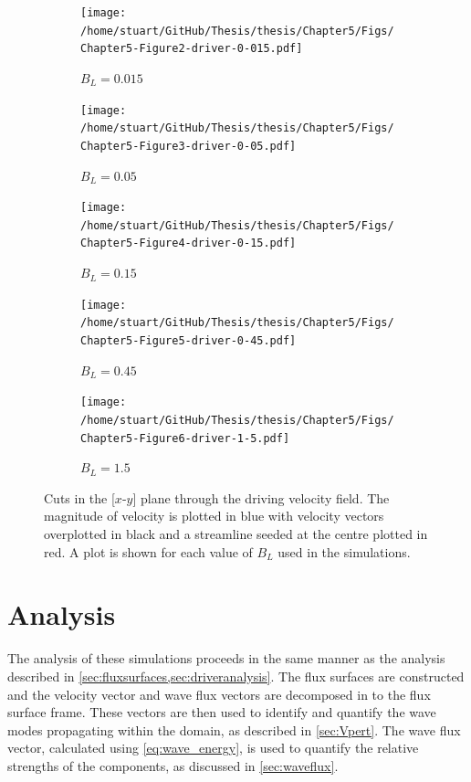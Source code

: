 \documentclass[a4paper,12pt,fourier,authoryear,custommargin]{Classes/PhDThesisPSnPDF}
\begin{document}
\begin{figure}
    \centering
    

    \begin{subfigure}[b]{0.495\columnwidth}
        \texttt{[image: /home/stuart/GitHub/Thesis/thesis/Chapter5/Figs/Chapter5-Figure2-driver-0-015.pdf]}
        \caption{$B_L = 0.015$}
        \label{fig:driver-0-015}
    \end{subfigure}
    \begin{subfigure}[b]{0.495\columnwidth}
        \texttt{[image: /home/stuart/GitHub/Thesis/thesis/Chapter5/Figs/Chapter5-Figure3-driver-0-05.pdf]}
        \caption{$B_L = 0.05$}
        \label{fig:driver-0-05}
    \end{subfigure}

    \begin{subfigure}[b]{0.495\columnwidth}
        \texttt{[image: /home/stuart/GitHub/Thesis/thesis/Chapter5/Figs/Chapter5-Figure4-driver-0-15.pdf]}
        \caption{$B_L = 0.15$}
        \label{fig:driver-0-15}
    \end{subfigure}
    \begin{subfigure}[b]{0.495\columnwidth}
        \texttt{[image: /home/stuart/GitHub/Thesis/thesis/Chapter5/Figs/Chapter5-Figure5-driver-0-45.pdf]}
        \caption{$B_L = 0.45$}
        \label{fig:driver-0-45}
    \end{subfigure}

    \begin{subfigure}[b]{0.495\columnwidth}
        \texttt{[image: /home/stuart/GitHub/Thesis/thesis/Chapter5/Figs/Chapter5-Figure6-driver-1-5.pdf]}
        \caption{$B_L = 1.5$}
        \label{fig:driver-1-5}
    \end{subfigure}
    \caption{Cuts in the [$x$-$y$] plane through the driving velocity field. The magnitude of velocity is plotted in blue with velocity vectors overplotted in black and a streamline seeded at the centre plotted in red. A plot is shown for each value of $B_L$ used in the simulations.}
    \label{fig:All_log_spirals}
\end{figure}

\section{Analysis}\label{sec:analysis}

The analysis of these simulations proceeds in the same manner as the analysis described in \cref{sec:fluxsurfaces,sec:driveranalysis}.
The flux surfaces are constructed and the velocity vector and wave flux vectors are decomposed in to the flux surface frame.
These vectors are then used to identify and quantify the wave modes propagating within the domain, as described in \cref{sec:Vpert}.
The wave flux vector, calculated using \cref{eq:wave_energy}, is used to quantify the relative strengths of the components, as discussed in \cref{sec:waveflux}.
\end{document}
